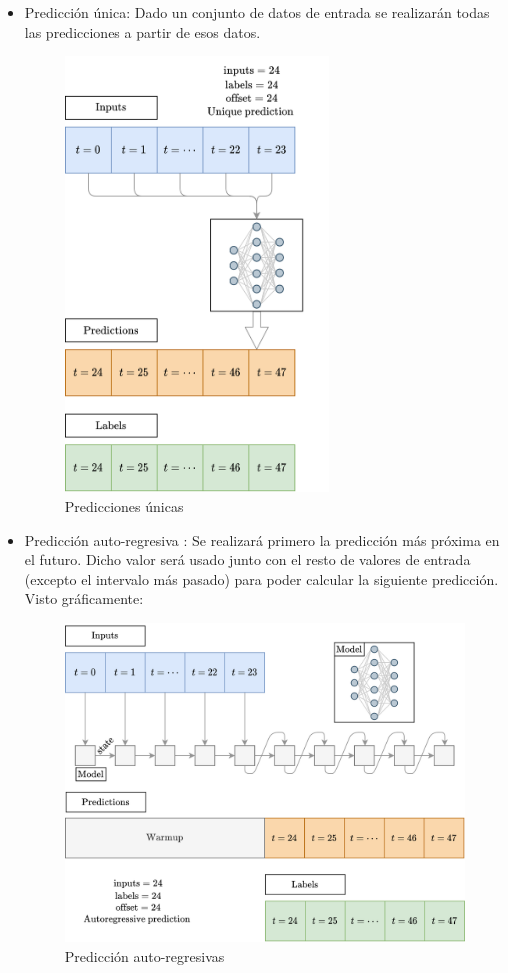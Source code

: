 \begin{itemize}
    \item Predicción única: Dado un conjunto de datos de entrada se realizarán todas las predicciones a partir de esos datos.
    
    \begin{figure}[H]
    \centering
    \includegraphics[width=7cm]{images/solution/modules/windows/windows-predictions-one-shot.png}
    \caption{Predicciones únicas}
    \end{figure}

    \item Predicción auto-regresiva \label{window_ar}: Se realizará primero la predicción más próxima en el futuro. Dicho valor será usado junto con el resto de valores de entrada (excepto el intervalo más pasado) para poder calcular la siguiente predicción. Visto gráficamente:
    \begin{figure}[H]
    \centering
    \includegraphics[width=12cm]{images/solution/modules/windows/windows-predictions-ar.png}
    \caption{Predicción auto-regresivas}
    \end{figure}
\end{itemize}

